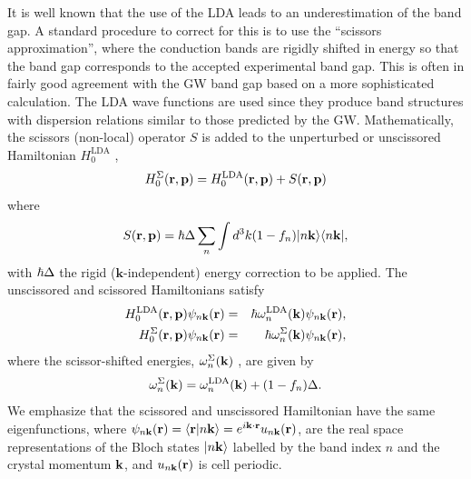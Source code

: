 \documentclass[floatfix,prb,aps,superscriptaddress,11pt,preprint,letterpaper]{revtex4}
\begin{document}
It is well known that the use of the LDA
leads to an underestimation of the band gap. A standard
procedure to correct for this is to
use the ``scissors approximation'', where the 
conduction bands are rigidly shifted in energy so that the band gap 
corresponds to the accepted 
experimental band gap.\cite{levinePRL89,levinePRL91,delsolePRB93} 
This is often in fairly good agreement with the GW
band gap based on a more sophisticated calculation.\cite{hybertsenPRB86}
The LDA wave functions are used since they produce band
structures with dispersion relations similar to those predicted by the GW.
Mathematically, the scissors (non-local) operator 
$S$ is added to the unperturbed or unscissored Hamiltonian $H^{\mathrm{LDA}}_{0}$ ,
\begin{equation*}
H^\Sigma_{0}(\mathbf{r},\mathbf{p})=H^{\mathrm{LDA}}_{0}(\mathbf{r},\mathbf{p})+S(\mathbf{r},\mathbf{p})
\end{equation*}
where 
\begin{equation}
S(\mathbf{r},\mathbf{p})=\hbar \Delta\sum_{n}\int d^{3}k(1-f_{n})
|n\mathbf{k}\rangle\langle n\mathbf{k}|,
\label{hats}
\end{equation}
with $\hbar \Delta$  the rigid ($\mathbf{k}$-independent) energy correction to be
applied. 
The unscissored and scissored Hamiltonians satisfy 
\begin{eqnarray*}
H^{\mathrm{LDA}}_{0}(\mathbf{r},\mathbf{p})\psi _{n\mathbf{k}}(\mathbf{r}) &=&\hbar \omega^{\mathrm{LDA}}_{n}(\mathbf{k})\psi _{n\mathbf{k}}(\mathbf{r}),
\label{hamils} \\
H_{0}^\Sigma (\mathbf{r},\mathbf{p})\psi _{n\mathbf{k}}(\mathbf{r}) &=&\hbar \omega_{n}^\Sigma
(\mathbf{k})\psi _{n\mathbf{k}}(\mathbf{r}),
\end{eqnarray*}
where the scissor-shifted energies, 
$\omega_{n}^\Sigma(\mathbf{k})$ , are given by
\begin{equation}
\omega_{n}^\Sigma(\mathbf{k})=\omega^{\mathrm{LDA}}_{n}(\mathbf{k})+(1-f_{n})\Delta.
\label{wese}
\end{equation}
We emphasize that the scissored and unscissored Hamiltonian 
have the same eigenfunctions, where
$\psi_{n\mathbf{k}}(\mathbf{r})=\langle {\mathbf{r}} | {n\mathbf{k}} \rangle=e^{i\mathbf{k}\cdot\mathbf{r}}u_{n\mathbf{k}}(\mathbf{r})$,
are the real space representations of the Bloch states $| n\mathbf{k} \rangle$ labelled 
by the band index $n$ and the crystal momentum $\mathbf{k}$, and $u_{n\mathbf{k}}(\mathbf{r})$
is cell periodic. 
\end{document}
